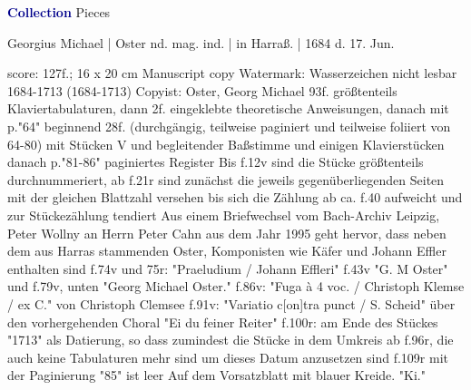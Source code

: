 \documentclass[twocolumn]{book}
\begin{document}
\newline \par \vspace{7pt} \textcolor{darkblue}{\textbf{Collection}}
 Pieces
\newline \begin{itshape} Georgius Michael | Oster nd. mag. ind. | in Harraß. | 1684 d. 17. Jun.\end{itshape} 
\newline \textcolor{darkblue}{}  score: 127f.; 16 x 20 cm
\newline Manuscript copy
\newline Watermark: Wasserzeichen nicht lesbar  1684-1713 (1684-1713)
\newline Copyist: Oster, Georg Michael
\newline 93f. größtenteils Klaviertabulaturen, dann 2f. eingeklebte theoretische Anweisungen, danach mit p."64" beginnend 28f. (durchgängig, teilweise paginiert und teilweise foliiert von 64-80) mit Stücken V und begleitender Baßstimme und einigen Klavierstücken danach p."81-86" paginiertes Register
\newline Bis f.12v sind die Stücke größtenteils durchnummeriert, ab f.21r sind zunächst die jeweils gegenüberliegenden Seiten mit der gleichen Blattzahl versehen bis sich die Zählung ab ca. f.40 aufweicht und zur Stückezählung tendiert
\newline Aus einem Briefwechsel vom Bach-Archiv Leipzig, Peter Wollny an Herrn Peter Cahn aus dem Jahr 1995 geht hervor, dass neben dem aus Harras stammenden Oster, Komponisten wie Käfer und Johann Effler enthalten sind
\newline f.74v und 75r: "Praeludium / Johann Effleri"
\newline f.43v "G. M Oster" und f.79v, unten "Georg Michael Oster."
\newline f.86v: "Fuga à 4 voc. / Christoph Klemse / ex C." von Christoph Clemsee
\newline f.91v: "Variatio c[on]tra punct / S. Scheid" über den vorhergehenden Choral "Ei du feiner Reiter"
\newline f.100r: am Ende des Stückes "1713" als Datierung, so dass zumindest die Stücke in dem Umkreis ab f.96r, die auch keine Tabulaturen mehr sind um dieses Datum anzusetzen sind
\newline f.109r mit der Paginierung "85" ist leer
\newline Auf dem Vorsatzblatt mit blauer Kreide. "Ki."
\end{document}
